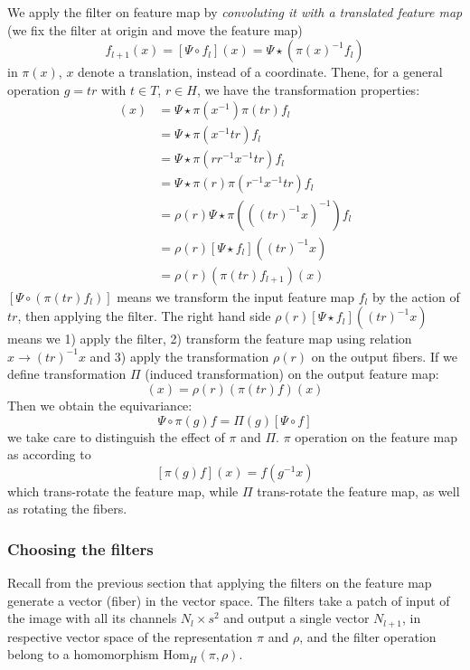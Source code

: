 \documentclass{article}
\begin{document}
We apply the filter on feature map by \emph{convoluting it with a translated 
feature map} (we fix the filter at origin and move the feature map)
\begin{equation}
    f_{l+1}(x) = [\Psi \circ f_l](x) = \Psi \star ( \pi(x)^{-1} f_l )
\end{equation}
in $\pi(x)$, $x$ denote a translation, instead of a coordinate. 
Thene, for a general operation $g = tr$ with $t\in T$, $r \in H$, we have the transformation 
properties:
\begin{align*}
    [\Psi \circ (\pi(tr)f_l)](x) 
        &= \Psi \star \pi(x^{-1})\pi(tr) f_l \\
        &= \Psi \star \pi(x^{-1}tr) f_l \\
        &= \Psi \star \pi(rr^{-1}x^{-1}tr) f_l \\
        &= \Psi \star \pi(r) \pi(r^{-1}x^{-1}tr) f_l \\
        &= \rho(r) \Psi \star \pi\left(\left((tr)^{-1}x\right)^{-1}\right) f_l \\
        &= \rho(r) [ \Psi \star  f_l ]  ((tr)^{-1}x)\\
        &= \rho(r) (\pi(tr) f_{l+1}) (x) 
\end{align*}
$[\Psi \circ (\pi(tr)f_l)]$ means we transform the input feature map $f_l$ by the action of $tr$, then applying the filter. The right hand side
$\rho(r) [ \Psi \star  f_l ]  ((tr)^{-1}x)$ means we 
1) apply the filter, 
2) transform the feature map using relation $x\to(tr)^{-1}x$ and 
3) apply the transformation $\rho(r)$ on the output fibers.
If we define transformation $\Pi$ (induced transformation) on the output feature map:
\begin{equation}
    [\Pi(tr) f ](x)= \rho(r) (\pi(tr) f) (x) \label{induced_transformation}
\end{equation}
Then we obtain the equivariance:
\begin{equation}
    \tag{Equivariance}
    \Psi \circ \pi(g) f = \Pi(g) [\Psi \circ f]
\end{equation}
we take care to distinguish the effect of $\pi$ and $\Pi$. $\pi$ operation on the feature map as according to 
\[[\pi(g) f](x) = f(g^{-1}x)\]
which trans-rotate the feature map, 
while $\Pi$ trans-rotate the feature map, as well as rotating the fibers.

\subsubsection*{Choosing the filters}
Recall from the previous section that 
applying the filters on the feature map generate a vector (fiber) in the vector space. 
The filters take a patch of input of the image with all its channels $N_l\times s^2$ and output a single vector $N_{l+1}$, in respective vector space of the 
representation $\pi$ and $\rho$, and the filter operation belong to a homomorphism $\text{Hom}_H(\pi, \rho)$. 
\end{document}
